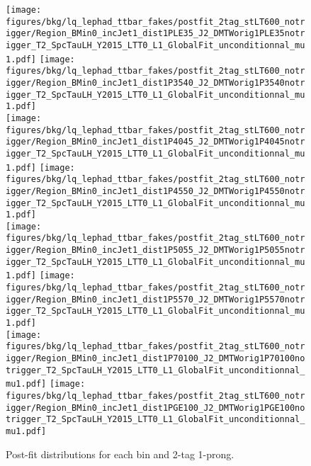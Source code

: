\begin{figure}
    \centering
    \texttt{[image: figures/bkg/lq\_lephad\_ttbar\_fakes/postfit\_2tag\_stLT600\_notrigger/Region\_BMin0\_incJet1\_dist1PLE35\_J2\_DMTWorig1PLE35notrigger\_T2\_SpcTauLH\_Y2015\_LTT0\_L1\_GlobalFit\_unconditionnal\_mu1.pdf]}
    \texttt{[image: figures/bkg/lq\_lephad\_ttbar\_fakes/postfit\_2tag\_stLT600\_notrigger/Region\_BMin0\_incJet1\_dist1P3540\_J2\_DMTWorig1P3540notrigger\_T2\_SpcTauLH\_Y2015\_LTT0\_L1\_GlobalFit\_unconditionnal\_mu1.pdf]} \\
    \texttt{[image: figures/bkg/lq\_lephad\_ttbar\_fakes/postfit\_2tag\_stLT600\_notrigger/Region\_BMin0\_incJet1\_dist1P4045\_J2\_DMTWorig1P4045notrigger\_T2\_SpcTauLH\_Y2015\_LTT0\_L1\_GlobalFit\_unconditionnal\_mu1.pdf]}
    \texttt{[image: figures/bkg/lq\_lephad\_ttbar\_fakes/postfit\_2tag\_stLT600\_notrigger/Region\_BMin0\_incJet1\_dist1P4550\_J2\_DMTWorig1P4550notrigger\_T2\_SpcTauLH\_Y2015\_LTT0\_L1\_GlobalFit\_unconditionnal\_mu1.pdf]} \\
    \texttt{[image: figures/bkg/lq\_lephad\_ttbar\_fakes/postfit\_2tag\_stLT600\_notrigger/Region\_BMin0\_incJet1\_dist1P5055\_J2\_DMTWorig1P5055notrigger\_T2\_SpcTauLH\_Y2015\_LTT0\_L1\_GlobalFit\_unconditionnal\_mu1.pdf]}
    \texttt{[image: figures/bkg/lq\_lephad\_ttbar\_fakes/postfit\_2tag\_stLT600\_notrigger/Region\_BMin0\_incJet1\_dist1P5570\_J2\_DMTWorig1P5570notrigger\_T2\_SpcTauLH\_Y2015\_LTT0\_L1\_GlobalFit\_unconditionnal\_mu1.pdf]} \\
    \texttt{[image: figures/bkg/lq\_lephad\_ttbar\_fakes/postfit\_2tag\_stLT600\_notrigger/Region\_BMin0\_incJet1\_dist1P70100\_J2\_DMTWorig1P70100notrigger\_T2\_SpcTauLH\_Y2015\_LTT0\_L1\_GlobalFit\_unconditionnal\_mu1.pdf]}
    \texttt{[image: figures/bkg/lq\_lephad\_ttbar\_fakes/postfit\_2tag\_stLT600\_notrigger/Region\_BMin0\_incJet1\_dist1PGE100\_J2\_DMTWorig1PGE100notrigger\_T2\_SpcTauLH\_Y2015\_LTT0\_L1\_GlobalFit\_unconditionnal\_mu1.pdf]} \\
  \caption{Post-fit \mtw distributions for each \pT bin and 2-tag 1-prong.}
  \label{fig:lq_ttbarfake_mtw_1p_postfit}
\end{figure}

